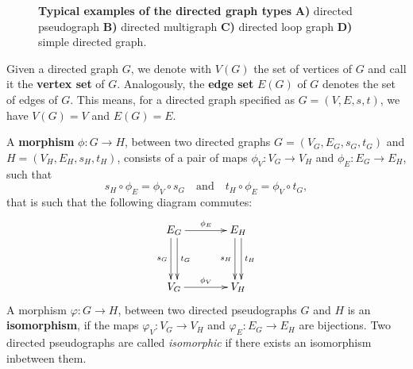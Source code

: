 \begin{figure}[!htbp]
  \centering 
  \vfill
  \vspace{0.25cm}
    \caption{%
      \textbf{Typical examples of the directed graph types}
      \textbf{A)} directed pseudograph \textbf{B)} directed
      multigraph \textbf{C)} directed loop graph \textbf{D)} simple
      directed graph.} %
  \label{fig:directed_graph_types}
\end{figure}

Given a directed graph $G$, we denote with $V(G)$ the set of vertices
of $G$ and call it the \textbf{vertex set} of $G$. Analogously, the
\textbf{edge set} $E(G)$ of $G$ denotes the set of edges of $G$. This
means, for a directed graph specified as $G = (V,E,s,t)$, we
have $V(G) = V$ and $E(G) = E$.

A \textbf{morphism} $\phi: G \to H$, between two directed graphs
$G=(V_G,E_G,s_G,t_G)$ and $H=(V_H,E_H,s_H,t_H)$, consists of a pair of
maps $\phi_V: V_G \to V_H$ and $\phi_E: E_G \to E_H$, such that
\[
s_H \circ \phi_E = \phi_V \circ s_G \mathrm{\quad and \quad} t_H \circ
\phi_E = \phi_V \circ t_G,
\]
that is such that the following diagram commutes:
%
\begin{align*} 
  \xymatrix@+=1.3cm{E_G \ar^{t_G}@<0.66ex>[d] \ar_{s_G}@<-0.66ex>[d]
    \ar^{\phi_E}[r] & E_H \ar^{t_H}@<0.66ex>[d]
    \ar_{s_H}@<-0.66ex>[d]\\ V_G \ar^{\phi_V}[r] & V_H}
\end{align*}
%
A morphism $\varphi: G \to H$, between two directed pseudographs $G$
and $H$ is an \textbf{isomorphism}, if the maps $\varphi_V: V_G \to
V_H$ and $\varphi_E: E_G \to E_H$ are bijections. Two directed
pseudographs are called \textit{isomorphic} if there exists an
isomorphism inbetween them.

